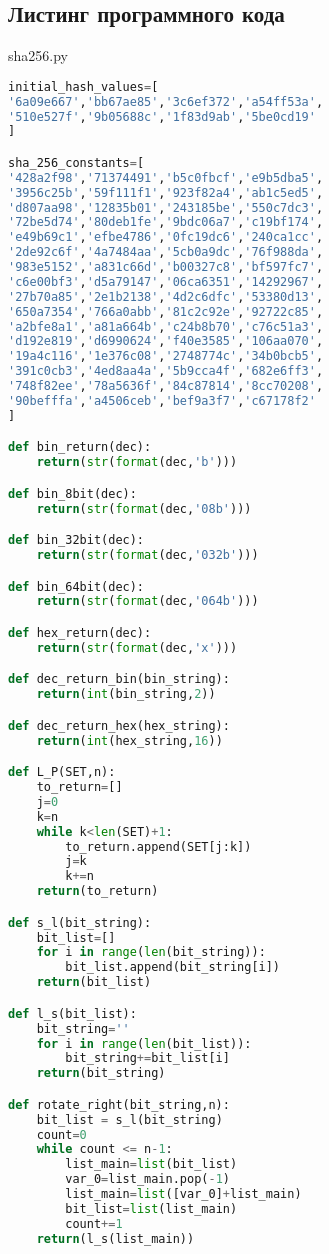 \documentclass[12pt]{article}
\begin{document}
\subsection*{Листинг программного кода}
sha256.py
\begin{lstlisting}[language=Python]
initial_hash_values=[
'6a09e667','bb67ae85','3c6ef372','a54ff53a',
'510e527f','9b05688c','1f83d9ab','5be0cd19'
]

sha_256_constants=[
'428a2f98','71374491','b5c0fbcf','e9b5dba5',
'3956c25b','59f111f1','923f82a4','ab1c5ed5',
'd807aa98','12835b01','243185be','550c7dc3',
'72be5d74','80deb1fe','9bdc06a7','c19bf174',
'e49b69c1','efbe4786','0fc19dc6','240ca1cc',
'2de92c6f','4a7484aa','5cb0a9dc','76f988da',
'983e5152','a831c66d','b00327c8','bf597fc7',
'c6e00bf3','d5a79147','06ca6351','14292967',
'27b70a85','2e1b2138','4d2c6dfc','53380d13',
'650a7354','766a0abb','81c2c92e','92722c85',
'a2bfe8a1','a81a664b','c24b8b70','c76c51a3',
'd192e819','d6990624','f40e3585','106aa070',
'19a4c116','1e376c08','2748774c','34b0bcb5',
'391c0cb3','4ed8aa4a','5b9cca4f','682e6ff3',
'748f82ee','78a5636f','84c87814','8cc70208',
'90befffa','a4506ceb','bef9a3f7','c67178f2'
]

def bin_return(dec):
    return(str(format(dec,'b')))

def bin_8bit(dec):
    return(str(format(dec,'08b')))

def bin_32bit(dec):
    return(str(format(dec,'032b')))

def bin_64bit(dec):
    return(str(format(dec,'064b')))

def hex_return(dec):
    return(str(format(dec,'x')))

def dec_return_bin(bin_string):
    return(int(bin_string,2))

def dec_return_hex(hex_string):
    return(int(hex_string,16))

def L_P(SET,n):
    to_return=[]
    j=0
    k=n
    while k<len(SET)+1:
        to_return.append(SET[j:k])
        j=k
        k+=n 
    return(to_return)

def s_l(bit_string):
    bit_list=[]
    for i in range(len(bit_string)):
        bit_list.append(bit_string[i])
    return(bit_list)

def l_s(bit_list):
    bit_string=''
    for i in range(len(bit_list)):
        bit_string+=bit_list[i]
    return(bit_string)

def rotate_right(bit_string,n):
    bit_list = s_l(bit_string)
    count=0
    while count <= n-1:
        list_main=list(bit_list)
        var_0=list_main.pop(-1)
        list_main=list([var_0]+list_main)
        bit_list=list(list_main)
        count+=1
    return(l_s(list_main))


\end{lstlisting}
\end{document}
